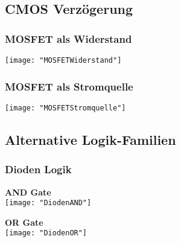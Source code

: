 \subsection{CMOS Verzögerung}
\begin{minipage}[t]{0.45\textwidth}
	\vspace{0pt}								%
	\subsubsection{MOSFET als Widerstand}
	\texttt{[image: "MOSFETWiderstand"]}
\end{minipage}\hspace{0.05\textwidth}
\begin{minipage}[t]{0.45\textwidth}
	\vspace{0pt}								%
	\subsubsection{MOSFET als Stromquelle}
	\texttt{[image: "MOSFETStromquelle"]}
\end{minipage}
\vspace{2mm}


\subsection{Alternative Logik-Familien}
\subsubsection{Dioden Logik}
\begin{minipage}[t]{0.3\textwidth}
	\vspace{0pt}
	\textbf{AND Gate}\\
	\texttt{[image: "DiodenAND"]}
\end{minipage}
\begin{minipage}[t]{0.3\textwidth}
	\vspace{0pt}
	\textbf{OR Gate}\\
	\texttt{[image: "DiodenOR"]}
\end{minipage}
\vspace{2mm}


